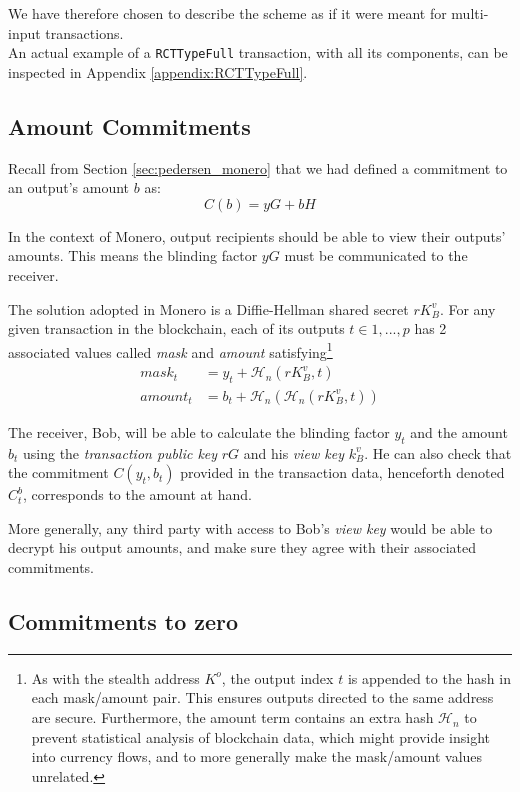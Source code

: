 We have therefore chosen to describe the scheme as if it were meant for multi-input transactions.
\\

An actual example of a {\tt RCTTypeFull} transaction, with all its components, can be inspected in Appendix \ref{appendix:RCTTypeFull}.


\subsection{Amount Commitments}
\label{amount-commitments}
Recall from Section \ref{sec:pedersen_monero} that we had defined a commitment to an output’s amount $b$ as: 
\[C(b) = y G + b H\]

In the context of Monero, output recipients should be able to view their outputs’ amounts. This means the blinding factor $y G$ must be communicated to the receiver.

The solution adopted in Monero is a Diffie-Hellman shared secret $r K_B^v$. For any given transaction in the blockchain, each of its outputs $t \in {1, ..., p}$ has 2 associated values called {\em mask} and {\em amount}  satisfying\footnote{As with the stealth address $K^o$, the output index $t$ is appended to the hash in each mask/amount pair. This ensures outputs directed to the same address are secure.
Furthermore, the amount term contains an extra hash $\mathcal{H}_n$ to prevent statistical analysis of blockchain data, which might provide insight into currency flows, and to more generally make the mask/amount values unrelated.}
\begin{align*}
  \mathit{mask}_t     &= y_t + \mathcal{H}_n(r K_B^v, t) \\
  \mathit{amount}_t   &= b_t + \mathcal{H}_n(\mathcal{H}_n(r K_B^v, t))
\end{align*}

The receiver, Bob, will be able to calculate the blinding factor $y_t$ and the amount $b_t$ using the {\em transaction public key} $r G$ and his {\em view key} $k_B^v$. He can also check that the commitment $C(y_t, b_t)$ provided in the transaction data, henceforth denoted $C_t^b$,  corresponds to the amount at hand.

More generally, any third party with access to Bob’s {\em view key} would be able to decrypt his output amounts, and make sure they agree with their associated commitments.



\subsection{Commitments to zero}
\label{sec:commitments-to-zero}

